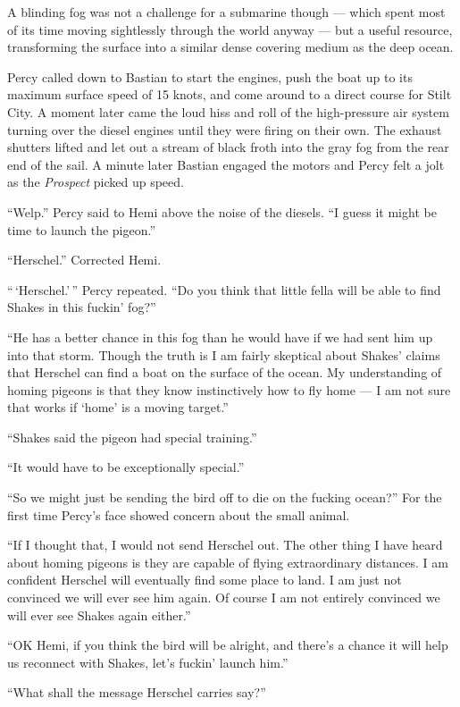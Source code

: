 \documentclass[
]{scrbook}
\begin{document}
A blinding fog was not a challenge for a submarine though --- which
spent most of its time moving sightlessly through the world anyway ---
but a useful resource, transforming the surface into a similar dense
covering medium as the deep ocean.

Percy called down to Bastian to start the engines, push the boat up to
its maximum surface speed of 15 knots, and come around to a direct
course for Stilt City. A moment later came the loud hiss and roll of the
high-pressure air system turning over the diesel engines until they were
firing on their own. The exhaust shutters lifted and let out a stream of
black froth into the gray fog from the rear end of the sail. A minute
later Bastian engaged the motors and Percy felt a jolt as the
\emph{Prospect} picked up speed.

``Welp.'' Percy said to Hemi above the noise of the diesels. ``I guess
it might be time to launch the pigeon.''

``Herschel.'' Corrected Hemi.

``\,`Herschel.'\,'' Percy repeated. ``Do you think that little fella
will be able to find Shakes in this fuckin' fog?''

``He has a better chance in this fog than he would have if we had sent
him up into that storm. Though the truth is I am fairly skeptical about
Shakes' claims that Herschel can find a boat on the surface of the
ocean. My understanding of homing pigeons is that they know
instinctively how to fly home --- I am not sure that works if `home' is
a moving target.''

``Shakes said the pigeon had special training.''

``It would have to be exceptionally special.''

``So we might just be sending the bird off to die on the fucking
ocean?'' For the first time Percy's face showed concern about the small
animal.

``If I thought that, I would not send Herschel out. The other thing I
have heard about homing pigeons is they are capable of flying
extraordinary distances. I am confident Herschel will eventually find
some place to land. I am just not convinced we will ever see him again.
Of course I am not entirely convinced we will ever see Shakes again
either.''

``OK Hemi, if you think the bird will be alright, and there's a chance
it will help us reconnect with Shakes, let's fuckin' launch him.''

``What shall the message Herschel carries say?''
\end{document}
